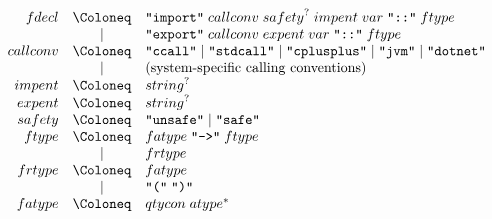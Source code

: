 \begin{align*}
  \begin{array}{rcl}
    {fdecl}
    & \Coloneq & \text{\texttt{\textquotedbl import\textquotedbl}}\; {callconv}\; {safety}^?\; {impent}\; {var}\; \text{\texttt{\textquotedbl ::\textquotedbl}}\; {ftype} \\
    & \mid & \text{\texttt{\textquotedbl export\textquotedbl}}\; {callconv}\; {expent}\; {var}\; \text{\texttt{\textquotedbl ::\textquotedbl}}\; {ftype} \\
    {callconv}
    & \Coloneq & \text{\texttt{\textquotedbl ccall\textquotedbl}}
    \mid \text{\texttt{\textquotedbl stdcall\textquotedbl}}
    \mid \text{\texttt{\textquotedbl cplusplus\textquotedbl}}
    \mid \text{\texttt{\textquotedbl jvm\textquotedbl}}
    \mid \text{\texttt{\textquotedbl dotnet\textquotedbl}}
    \\
    & \mid & (\text{system-specific calling conventions}) \\
    {impent}
    & \Coloneq & {string}^? \\
    {expent}
    & \Coloneq & {string}^? \\
    {safety}
    & \Coloneq & \text{\texttt{\textquotedbl unsafe\textquotedbl}}
    \mid \text{\texttt{\textquotedbl safe\textquotedbl}}
    \\
    {ftype}
    & \Coloneq & {fatype}\; \text{\texttt{\textquotedbl ->\textquotedbl}}\; {ftype} \\
    & \mid & {frtype} \\
    {frtype}
    & \Coloneq & {fatype} \\
    & \mid & \text{\texttt{\textquotedbl(\textquotedbl}}\; \text{\texttt{\textquotedbl)\textquotedbl}} \\
    {fatype}
    & \Coloneq & {qtycon}\; {atype}^*
  \end{array}
\end{align*}

